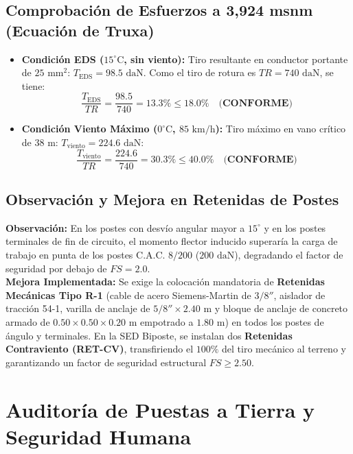 \documentclass[12pt,a4paper]{report}
\begin{document}
\subsection{Comprobación de Esfuerzos a 3,924 msnm (Ecuación de Truxa)}
\begin{itemize}
    \item \textbf{Condición EDS ($15^\circ\text{C}$, sin viento):} Tiro resultante en conductor portante de $25\text{ mm}^2$: $T_{\text{EDS}} = 98.5\text{ daN}$. Como el tiro de rotura es $TR = 740\text{ daN}$, se tiene:
    \begin{equation}
        \frac{T_{\text{EDS}}}{TR} = \frac{98.5}{740} = 13.3\% \le 18.0\% \quad \textbf{(CONFORME)}
    \end{equation}
    \item \textbf{Condición Viento Máximo ($0^\circ\text{C}$, $85\text{ km/h}$):} Tiro máximo en vano crítico de $38\text{ m}$: $T_{\text{viento}} = 224.6\text{ daN}$:
    \begin{equation}
        \frac{T_{\text{viento}}}{TR} = \frac{224.6}{740} = 30.3\% \le 40.0\% \quad \textbf{(CONFORME)}
    \end{equation}
\end{itemize}

\subsection{Observación y Mejora en Retenidas de Postes}
\textbf{Observación:} En los postes con desvío angular mayor a $15^\circ$ y en los postes terminales de fin de circuito, el momento flector inducido superaría la carga de trabajo en punta de los postes C.A.C. $8/200$ ($200\text{ daN}$), degradando el factor de seguridad por debajo de $FS = 2.0$.\\
\textbf{Mejora Implementada:} Se exige la colocación mandatoria de \textbf{Retenidas Mecánicas Tipo R-1} (cable de acero Siemens-Martin de $3/8''$, aislador de tracción 54-1, varilla de anclaje de $5/8'' \times 2.40\text{ m}$ y bloque de anclaje de concreto armado de $0.50\times0.50\times0.20\text{ m}$ empotrado a $1.80\text{ m}$) en todos los postes de ángulo y terminales. En la SED Biposte, se instalan dos \textbf{Retenidas Contraviento (RET-CV)}, transfiriendo el $100\%$ del tiro mecánico al terreno y garantizando un factor de seguridad estructural $FS \ge 2.50$.

\section{Auditoría de Puestas a Tierra y Seguridad Humana}
\end{document}
